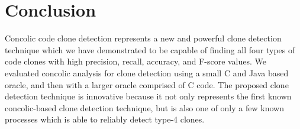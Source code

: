 \documentclass{sig-alternate}
\begin{document}
\section{Conclusion}
\label{sec: conclusion}



Concolic code clone detection represents a new and powerful clone detection technique which we have demonstrated to be capable of finding all four types of code clones with high precision, recall, accuracy, and F-score values. We evaluated concolic analysis for clone detection using a small C and Java based oracle, and then with a larger oracle comprised of C code. The proposed clone detection technique is innovative because it not only represents the first known concolic-based clone detection technique, but is also one of only a few known processes which is able to reliably detect type-4 clones.


\balance

 

\balancecolumns
\end{document}
